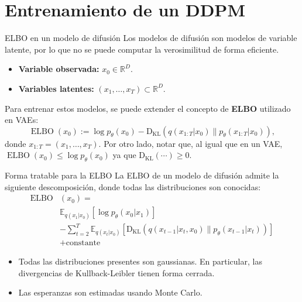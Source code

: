\documentclass{beamer}
\newcommand{\R}{\mathbb{R}}
\begin{document}
\section{Entrenamiento de un DDPM}

\begin{frame}{ELBO en un modelo de difusión}
    Los modelos de difusión son modelos de variable latente, por lo que no se puede computar la verosimilitud de forma eficiente.
    \begin{itemize}
        \item \textbf{Variable observada:} $x_0\in\R^D$.
        \item \textbf{Variables latentes:} $(x_1,\ldots,x_T)\subset\R^D$.
    \end{itemize}
    Para entrenar estos modelos, se puede extender el concepto de \textbf{ELBO} utilizado en VAEs:
    \begin{equation*}
        \operatorname{ELBO}(x_0) := \log p_\theta(x_0)-\operatorname{D_{KL}}\left(q(x_{1:T}|x_0)\| p_\theta(x_{1:T}|x_0)\right),
    \end{equation*}
    donde $x_{1:T} = (x_1,\ldots,x_T)$. Por otro lado, notar que, al igual que en un VAE, $\operatorname{ELBO}(x_0)\leq \log p_\theta(x_0)$ ya que $\operatorname{D_{KL}}(\cdots)\geq0$.
\end{frame}

\begin{frame}{Forma tratable para la ELBO}
    La ELBO de un modelo de difusión admite la siguiente descomposición, donde todas las distribuciones son conocidas:
    \begin{align*}
        \operatorname{ELBO} & (x_0) =                                                                                                                        \\
                            & \mathbb{E}_{q(x_1|x_0)}\left[\log p_\theta(x_0|x_1)\right]                                                                     \\
                            & - \sum_{t=2}^T \mathbb{E}_{q(x_t|x_0)}\left[\operatorname{D_{KL}}\left(q(x_{t-1}|x_t,x_0)\|p_\theta(x_{t-1}|x_t)\right)\right] \\
                            & +\text{constante}
    \end{align*}
    \vspace{-0.8cm}
    \begin{itemize}
        \item Todas las distribuciones presentes son gaussianas. En particular, las divergencias de Kullback-Leibler tienen forma cerrada.
        \item Las esperanzas son estimadas usando Monte Carlo.
    \end{itemize}
\end{frame}
\end{document}
